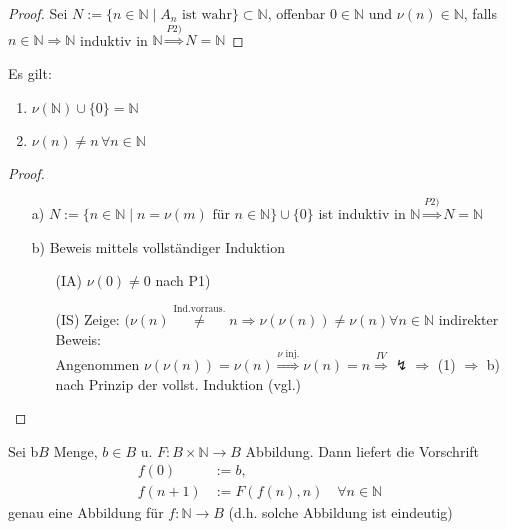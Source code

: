 \begin{proof}
	Sei $N := \{n \in \mathbb{N} \mid A_n \text{ ist wahr}\} \subset \mathbb{N}$, offenbar $0 \in \mathbb{N}$ und $\nu(n) \in \mathbb{N}$, falls $n \in \mathbb{N} \Rightarrow \mathbb{N}$ induktiv in $\mathbb{N} \overset{P2)}{\Rightarrow} N = \mathbb{N}$
\end{proof}

\begin{lemma}
	Es gilt:
	\begin{enumerate}[label={\alph*)}]
		\item $\nu(\mathbb{N})\cup \{0\}=\mathbb{N}$
		\item $\nu(n)\neq n\,\forall n\in\mathbb{N}$
	\end{enumerate}
\end{lemma}

\begin{proof}
	\begin{itemize}
		\item[a)] $N := \{n \in \mathbb{N} \mid n = \nu(m) \text{ für } n\in \mathbb{N} \} \cup \{ 0 \}$ ist induktiv in $\mathbb{N} \overset{P2)}{\Rightarrow} N = \mathbb{N}$
		\item[b)] Beweis mittels vollständiger Induktion
		\begin{itemize}
			\item[(IA)] $\nu(0) \neq 0$ nach P1)
			\item[(IS)] Zeige: $(\nu(n) \overset{\text{Ind.vorraus.}}{\neq} n \Rightarrow \nu(\nu(n)) \neq \nu(n) \forall n \in \mathbb{N}$
		indirekter Beweis: \\
		Angenommen $\nu(\nu(n)) = \nu(n) \overset{\nu \text{ inj.}}{\Rightarrow} \nu(n) = n \overset{IV}{\Rightarrow} \lightning \Rightarrow$ (1) $\Rightarrow$ b) nach Prinzip der vollst. Induktion (vgl.)
		\end{itemize}
	\end{itemize}
\end{proof}

\begin{proposition}
	Sei b$B$ Menge, $b\in B$ u. $F:B\times\mathbb{N}\rightarrow B$ Abbildung. Dann liefert die Vorschrift \begin{align}\label{rekur_definition}
		f(0) &:= b,\\f(n+1)&:=F(f(n),n)\quad\forall n\in \mathbb{N}
	\end{align}
	genau eine Abbildung für $f:\mathbb{N}\rightarrow B$ (d.h. solche Abbildung ist eindeutig)
\end{proposition}

